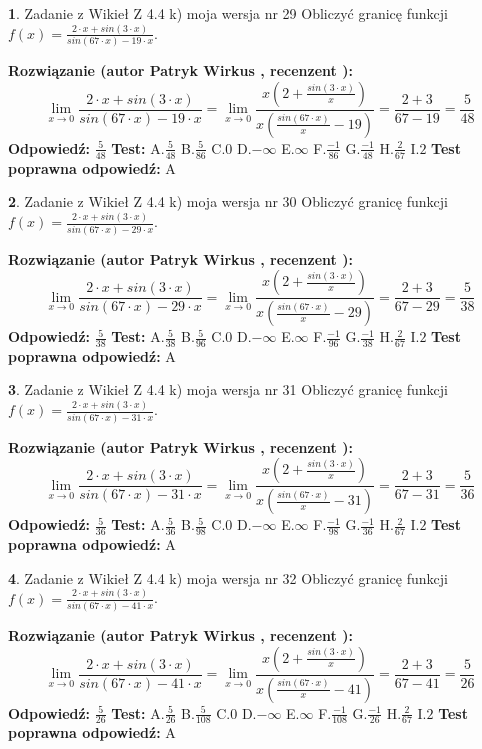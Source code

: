 \documentclass[12pt, a4paper]{article}
\theoremstyle{definition} %
\newtheorem{zad}{}
\newcommand{\zadStart}[1]{\begin{zad}#1\newline}
\newcommand{\zadStop}{\end{zad}}
\newcommand{\rozwStart}[2]{\noindent \textbf{Rozwiązanie (autor #1 , recenzent #2): }\newline}
\newcommand{\rozwStop}{\newline}
\newcommand{\odpStart}{\noindent \textbf{Odpowiedź:}\newline}
\newcommand{\odpStop}{\newline}
\newcommand{\testStart}{\noindent \textbf{Test:}\newline}
\newcommand{\testStop}{\newline}
\newcommand{\kluczStart}{\noindent \textbf{Test poprawna odpowiedź:}\newline}
\newcommand{\kluczStop}{\newline}
\begin{document}
\zadStart{Zadanie z Wikieł Z 4.4 k) moja wersja nr 29}
Obliczyć granicę funkcji $f(x)=\frac{2\cdot x +sin(3\cdot x)}{sin(67\cdot x) -19\cdot x}$.
\zadStop
\rozwStart{Patryk Wirkus}{}
$$\lim\limits_{x\to 0}\frac{2\cdot x +sin(3\cdot x)}{sin(67\cdot x) -19\cdot x}
=\lim\limits_{x\to 0}\frac{x(2+\frac{sin(3\cdot x)}{x})}{x(\frac{sin(67\cdot x)}{x}-19)}
=\frac{2+3}{67-19} = \frac{5}{48}$$
\rozwStop
\odpStart
$\frac{5}{48}$
\odpStop
\testStart
A.$\frac{5}{48}$
B.$\frac{5}{86}$
C.$0$
D.$-\infty$
E.$\infty$
F.$\frac{-1}{86}$
G.$\frac{-1}{48}$
H.$\frac{2}{67}$
I.$2$
\testStop
\kluczStart
A
\kluczStop



\zadStart{Zadanie z Wikieł Z 4.4 k) moja wersja nr 30}
Obliczyć granicę funkcji $f(x)=\frac{2\cdot x +sin(3\cdot x)}{sin(67\cdot x) -29\cdot x}$.
\zadStop
\rozwStart{Patryk Wirkus}{}
$$\lim\limits_{x\to 0}\frac{2\cdot x +sin(3\cdot x)}{sin(67\cdot x) -29\cdot x}
=\lim\limits_{x\to 0}\frac{x(2+\frac{sin(3\cdot x)}{x})}{x(\frac{sin(67\cdot x)}{x}-29)}
=\frac{2+3}{67-29} = \frac{5}{38}$$
\rozwStop
\odpStart
$\frac{5}{38}$
\odpStop
\testStart
A.$\frac{5}{38}$
B.$\frac{5}{96}$
C.$0$
D.$-\infty$
E.$\infty$
F.$\frac{-1}{96}$
G.$\frac{-1}{38}$
H.$\frac{2}{67}$
I.$2$
\testStop
\kluczStart
A
\kluczStop



\zadStart{Zadanie z Wikieł Z 4.4 k) moja wersja nr 31}
Obliczyć granicę funkcji $f(x)=\frac{2\cdot x +sin(3\cdot x)}{sin(67\cdot x) -31\cdot x}$.
\zadStop
\rozwStart{Patryk Wirkus}{}
$$\lim\limits_{x\to 0}\frac{2\cdot x +sin(3\cdot x)}{sin(67\cdot x) -31\cdot x}
=\lim\limits_{x\to 0}\frac{x(2+\frac{sin(3\cdot x)}{x})}{x(\frac{sin(67\cdot x)}{x}-31)}
=\frac{2+3}{67-31} = \frac{5}{36}$$
\rozwStop
\odpStart
$\frac{5}{36}$
\odpStop
\testStart
A.$\frac{5}{36}$
B.$\frac{5}{98}$
C.$0$
D.$-\infty$
E.$\infty$
F.$\frac{-1}{98}$
G.$\frac{-1}{36}$
H.$\frac{2}{67}$
I.$2$
\testStop
\kluczStart
A
\kluczStop



\zadStart{Zadanie z Wikieł Z 4.4 k) moja wersja nr 32}
Obliczyć granicę funkcji $f(x)=\frac{2\cdot x +sin(3\cdot x)}{sin(67\cdot x) -41\cdot x}$.
\zadStop
\rozwStart{Patryk Wirkus}{}
$$\lim\limits_{x\to 0}\frac{2\cdot x +sin(3\cdot x)}{sin(67\cdot x) -41\cdot x}
=\lim\limits_{x\to 0}\frac{x(2+\frac{sin(3\cdot x)}{x})}{x(\frac{sin(67\cdot x)}{x}-41)}
=\frac{2+3}{67-41} = \frac{5}{26}$$
\rozwStop
\odpStart
$\frac{5}{26}$
\odpStop
\testStart
A.$\frac{5}{26}$
B.$\frac{5}{108}$
C.$0$
D.$-\infty$
E.$\infty$
F.$\frac{-1}{108}$
G.$\frac{-1}{26}$
H.$\frac{2}{67}$
I.$2$
\testStop
\kluczStart
A
\kluczStop
\end{document}
